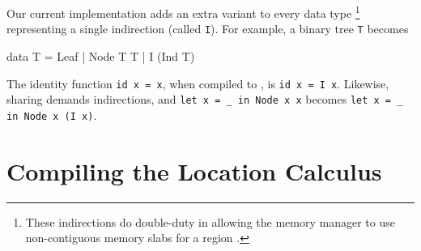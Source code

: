 \documentclass[showabstract,showacknowledgments,showpreface,showdedication]{iuphd}
\theoremstyle{nonumberplain}
\newcommand{\il}[1]{\lstinline[style=inline,mathescape=true];#1;}
\begin{document}
Our current implementation adds an extra variant to every data type
\footnote{These indirections do double-duty in allowing the memory
  manager to use non-contiguous memory slabs for a region .}
representing a single indirection (called \il{I}).  For example, a binary tree
\il{T} becomes
\begin{code}
data T = Leaf | Node T T | I (Ind T)
\end{code}
%
The identity function \il{id x = x}, when compiled to \ourcalc, is \il{id x = I x}.
Likewise, sharing demands indirections, and 
\il{let x = _ in Node x x}
becomes
\il{let x = _ in Node x (I x)}.
%
%



\section{Compiling the Location Calculus} \label{sec:impl-local}
\end{document}
